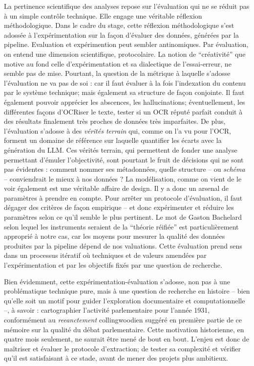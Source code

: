 La pertinence scientifique des analyses repose sur l'évaluation qui ne se réduit pas à un simple contrôle technique. Elle engage une véritable réflexion méthodologique. Dans le cadre du stage, cette réflexion méthodologique s'est adossée à l’expérimentation sur la façon d'évaluer des données, générées par la pipeline. Evaluation et expérimention peut sembler antinomiques. Par évaluation, on entend une dimension scientifique, protocolaire. La notion de \enquote{créativité} que motive au fond celle d'expérimentation et sa dialectique de l'essai-erreur, ne semble pas de mise. Pourtant, la question de la métrique à laquelle s'adosse l'évaluation ne va pas de soi : car il faut évaluer à la fois l'indexation du contenu par le système technique; mais également sa structure de façon conjointe. Il faut également pouvoir apprécier les abscences, les hallucinations; éventuellement, les différentes façons d'OCRiser le texte, tester si un OCR réputé parfait conduit à des résultats finalement très proches de données très imparfaites. De plus, l'évaluation s'adosse à des \emph{vérités terrain} qui, comme on l'a vu pour l'OCR, forment un domaine de référence sur laquelle quantifier les écarts avec la génération du LLM. Ces vérités terrain, qui permettent de fonder une analyse permettant d'émuler l'objectivité, sont pourtant le fruit de décisions qui ne sont pas évidentes : comment nommer ses métadonnées, quelle structure -- ou \emph{schéma} -- conviendrait le mieux à nos données ? La modélisation, comme on vient de le voir également est une véritable affaire de design. Il y a donc un arsenal de paramètres à prendre en compte. Pour arrêter un protocole d'évaluation, il faut dégager des critères de façon empirique -- et donc expérimenter et réduire les paramètres selon ce qu'il semble le plus pertinent. Le mot de Gaston Bachelard selon lequel les instruments seraient de la \enquote{théorie réifiée} est particulièrement approprié à notre cas, car les moyens pour mesurer la qualité des données produites par la pipeline dépend de nos valuations. Cette évaluation prend sens dans un processus itératif où techniques et de valeurs amendées par l'expérimentation et par les objectifs fixés par une question de recherche.

Bien évidemment, cette expérimentation-évaluation s'adosse, non pas à une problématique technique pure, mais à une question de recherche en histoire -- bien qu'elle soit un motif pour guider l'exploration documentaire et computationnelle --, à savoir : cartographier l'activité parlementaire pour l'année 1931, conformément au \emph{reeanctement} collingwoodien suggéré en première partie de ce mémoire sur la qualité du débat parlementaire. Cette motivation historienne, en quatre mois seulement, ne saurait être mené de bout en bout. L'enjeu est donc de maîtriser et évaluer le protocole d'extraction; de tester sa complexité et vérifier qu'il est satisfaisant à ce stade, avant de mener des projets plus ambitieux.

